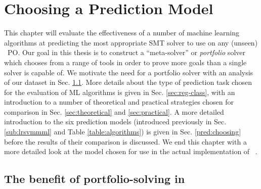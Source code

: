 \chapter{Choosing a Prediction Model}
\thispagestyle{nohead}
\label{Prediction}

This chapter will evaluate the effectiveness of a number of machine learning algorithms at predicting the most appropriate SMT solver to use on any (unseen) \why~PO.
Our goal in this thesis is to construct a ``meta-solver'' or \textit{portfolio} solver which chooses from a range of tools in order to prove more goals than a single solver is capable of.
We motivate the need for a portfolio solver with an analysis of our dataset 
in Sec. \ref{sec:portfolio-benefit}. 
More details about the type of prediction task chosen for the evaluation of ML algorithms is given in Sec. \ref{sec:reg-class}, with an introduction to a number of theoretical and practical strategies chosen for comparison in Sec. \ref{sec:theoretical} and \ref{sec:practical}. A more detailed introduction to the six prediction models (introduced previously in Sec. \ref{sub:lrsvmmml} and Table \ref{table:algorithms}) is given in Sec. \ref{pred:choosing} before the results of their comparison is discussed. We end this chapter with a more detailed look at the model chosen for use in the actual implementation of \where~.

\section{The benefit of portfolio-solving in \why}
\label{sec:portfolio-benefit}

